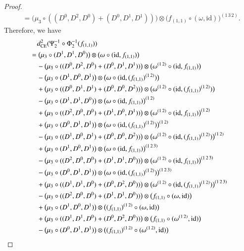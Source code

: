 \documentclass[12pt]{amsart}
\theoremstyle{definition}
\newcommand{\id}{\mathrm{id}}
\newcommand{\ot}{\otimes}
\newcommand{\ce}{{\rm CE}}
\newcommand{\ff}{f_{(1,1)}}
\begin{document}
\begin{proof}
\begin{align*}
	&=\bigl(\mu_3\circ((D^0,D^2,D^0)+(D^0,D^1,D^1))\bigr)\ot \bigl(f_{(1,1)}\circ(\omega,\id)\bigr)^{(1\,3\,2)}.
\end{align*}
Therefore, we have
\begin{align*}
	&\quad d_\ce^2(\Psi_2^{-1}\circ\Phi_2^{-1}(f_{(1,1)}))\\
	&=\bigl(\mu_3\circ(D^1,D^1,D^0)\bigr)\ot \bigl(\omega\circ (\id, f_{(1,1)})\bigr)\\
	&\quad-\bigl(\mu_3\circ((D^0,D^2,D^0)+(D^0,D^1,D^1))\bigr)\ot\bigl(\omega^{(1\,2)}\circ(\id,\ff)\bigr)\\
	&\quad-\bigl(\mu_3\circ(D^1,D^0,D^1)\bigr)\ot \bigl(\omega\circ(\id,(\ff)^{(1\,2)})\bigr)\\
	&\quad+\bigl(\mu_3\circ((D^0,D^1,D^1)+(D^0,D^0,D^2))\bigr)\ot\bigl(\omega^{(1\,2)}\circ(\id,(\ff)^{(1\,2)} )\bigr)\\
	&\quad-\big(\mu_3\circ(D^1,D^1,D^0)\big)\ot \big(\omega\circ (\id, f_{(1,1)})\big)^{(1\,2)}\\
	&\quad+\bigl(\mu_3\circ((D^2,D^0,D^0)+(D^1,D^0,D^1))\bigr)\ot\bigl(\omega^{(1\,2)}\circ(\id,\ff)\bigr)^{(1\,2)}\\
	&\quad+\bigl(\mu_3\circ(D^0,D^1,D^1)\bigr)\ot \bigl(\omega\circ(\id,(\ff)^{(1\,2)})\bigr)^{(1\,2)}\\
	&\quad-\bigl(\mu_3\circ((D^1,D^0,D^1)+(D^0,D^0,D^2))\bigr)\ot\bigl(\omega^{(1\,2)}\circ(\id,(\ff)^{(1\,2)} )\bigr)^{(1\,2)}\\
	&\quad+\bigl(\mu_3\circ(D^1,D^0,D^1)\bigr)\ot \bigl(\omega\circ (\id, f_{(1,1)})\bigr)^{(1\,2\,3)}\\
	&\quad-\bigl(\mu_3\circ((D^2,D^0,D^0)+(D^1,D^1,D^0))\bigr)\ot\bigl(\omega^{(1\,2)}\circ(\id,\ff)\bigr)^{(1\,2\,3)}\\
	&\quad-\bigl(\mu_3\circ(D^0,D^1,D^1)\bigr)\ot \bigl(\omega\circ(\id,(\ff)^{(1\,2)})\bigr)^{(1\,2\,3)}\\
	&\quad+\bigl(\mu_3\circ((D^1,D^1,D^0)+(D^0,D^2,D^0))\bigr)\ot\bigl(\omega^{(1\,2)}\circ(\id,(\ff)^{(1\,2)} )\bigr)^{(1\,2\,3)}\\
	&\quad-\bigl(\mu_3\circ((D^2,D^0,D^0)+(D^1,D^1,D^0))\bigr)\ot\bigl(\ff\circ(\omega,\id)\bigr)\\
	&\quad+\bigl(\mu_3\circ(D^1,D^0,D^1)\bigr)\ot\bigl((\ff)^{(1\,2)}\circ(\omega,\id)\bigr)\\
	&\quad+\bigl(\mu_3\circ((D^1,D^1,D^0)+(D^0,D^2,D^0))\bigr)\ot\bigl(\ff\circ(\omega^{(1\,2)},\id)\bigr)\\
	&\quad-\bigl(\mu_3\circ(D^0,D^1,D^1)\bigr)\ot\bigl((\ff)^{(1\,2)}\circ(\omega^{(1\,2)},\id)\bigr)\\

\end{align*}
\end{proof}
\end{document}
